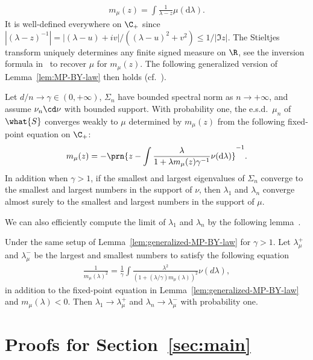 \documentclass[11pt]{article}
\newcommand{\de}{\mathrm{d}}
\begin{document}
\begin{align} \label{eq:Stieltjes-transform}
    m_{\mu}(z) = \int \frac{1}{\lambda - z} \mu(\de \lambda).
\end{align}
It is well-defined everywhere on $\C_+$ since $|(\lambda-z)^{-1}| = |(\lambda - u) + iv|/((\lambda-u)^2 + v^2) \leq 1/|\Im z|$. The Stieltjes transform uniquely determines any finite signed measure on $\R$, see the inversion formula in~\cite[Thm.~B.8]{bai2010spectral} to recover $\mu$ for $m_{\mu}(z)$. The following generalized version of Lemma~\ref{lem:MP-BY-law} then holds (cf.~\cite[Thm.~4.3 and Thm.~6.3]{bai2010spectral}).
\begin{lemma} \label{lem:generalized-MP-BY-law}
    Let $d/n \to \gamma \in (0, +\infty)$, $\Sigma_n$ have bounded spectral norm as $n\to+\infty$, and assume $\nu_n \cd \nu$ with bounded support. With probability one, the e.s.d.\ $\mu_n$ of $\what{S}$ converges weakly to $\mu$ determined by $m_{\mu}(z)$ from the following fixed-point equation on $\C_+$:
    \begin{align*}
        m_\mu(z) = - \prn{z-\int \frac{\lambda}{1 + \lambda m_\mu(z) \gamma^{-1}} \nu(\de \lambda)}^{-1}.
    \end{align*}
    In addition when $\gamma > 1$, if the smallest and largest eigenvalues of $\Sigma_n$ converge to the smallest and largest numbers in the support of $\nu$, then $\lambda_1$ and $\lambda_n$ converge almost surely to the smallest and largest numbers in the support of $\mu$.
\end{lemma}
We can also efficiently compute the limit of $\lambda_1$ and $\lambda_n$ by the following lemma~\cite[Thm.~4.2]{silverstein1995analysis}.
\begin{lemma} \label{lem:edge-equations}
    Under the same setup of Lemma~\ref{lem:generalized-MP-BY-law} for $\gamma > 1$. Let $\lambda_{\mu}^+$ and $\lambda_{\mu}^-$ be the largest and smallest numbers to satisfy the following equation
    \begin{align*}
        \frac{1}{m_{\mu}(\lambda)^2} = \frac{1}{\gamma} \int \frac{\lambda^2}{(1+(\lambda / \gamma) m_{\mu}(\lambda))^2} \nu(d \lambda),
    \end{align*}
    in addition to the fixed-point equation in Lemma~\ref{lem:generalized-MP-BY-law} and $m_{\mu}(\lambda) < 0$. Then $\lambda_1 \to \lambda_\mu^+$ and $\lambda_n \to \lambda_\mu^-$ with probability one.
\end{lemma}

\section{Proofs for Section~\ref{sec:main}}
\end{document}
